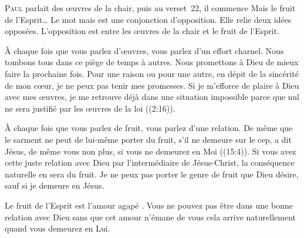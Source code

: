 \dvrule








\lettrine{P}{aul} parlait des \oe{}uvres de la chair,
 puis au verset~22, il commence\frcolon{} 
 \Og Mais le fruit de l'Esprit\dots{} \Fg{}
 Le mot \Og mais \Fg{} est une conjonction d'opposition.
 Elle relie deux idées opposées.
 L'opposition est entre les \oe{}uvres de la chair et le fruit de l'Esprit.

À chaque fois que vous parlez d'\oe{}uvres, vous parlez d'un effort charnel.
 Nous tombons tous dans ce piège de temps à autres. Nous promettons à Dieu
 de mieux faire la prochaine fois. Pour une raison ou pour une autre,
 en dépit de la sincérité de mon c\oe{}ur, je ne peux pas tenir mes promesses.
 Si je m'efforce de plaire à Dieu avec mes \oe{}uvres, je me retrouve déjà
 dans une situation impossible parce que 
 \Og nul ne sera justifié par les \oe{}uvres de la loi \Fg{}
 ((2:16)). 



À chaque fois que vous parlez de fruit, vous parlez d'une relation.
 \Og De même que le sarment ne peut de lui-même porter du fruit,
 s'il ne demeure sur le cep, a dit Jésus, 
 de même vous non plus, si vous ne demeurez en Moi \Fg{}
 ((15:4)).
 Si vous avez cette juste relation avec Dieu par l'intermédiaire de Jésus-Christ,
 la conséquence naturelle en sera du fruit. Je ne peux pas porter
 le genre de fruit que Dieu désire, sauf si je demeure en Jésus.

Le fruit de l'Esprit est l'amour \Og agapé \Fg{}. Vous ne pouvez pas être
 dans une bonne relation avec Dieu sans que cet amour n'émane de vous
 \ocadr cela arrive naturellement quand vous demeurez en Lui.

